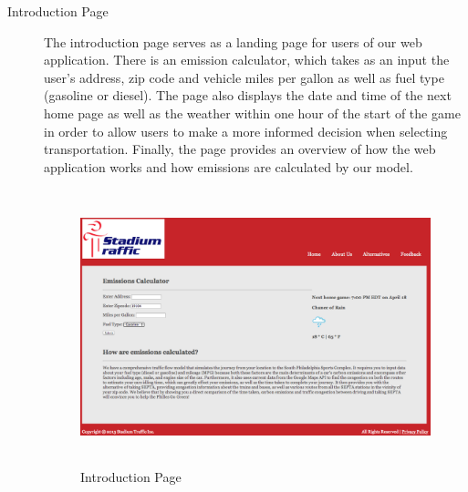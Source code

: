 \begin{description}
    \item[Introduction Page] The introduction page serves as a landing
  page for users of our web application. There is an emission
  calculator, which takes as an input the user's address, zip code and
  vehicle miles per gallon as well as fuel type (gasoline or
  diesel). The page also displays the date and time of the next home
  page as well as the weather within one hour of the start of the game
  in order to allow users to make a more informed decision when
  selecting transportation. Finally, the page provides an overview of
  how the web application works and how emissions are calculated by
  our model.
  \begin{figure}[htp]
    \centering
    \includegraphics[height=8cm]{graphics/website/intro.png}
    \caption{Introduction Page}
  \end{figure}


\end{description}
